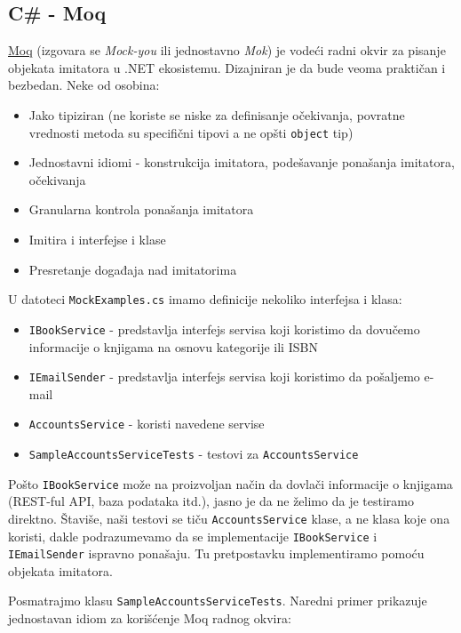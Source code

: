 \subsection{C\# - Moq}\label{c---moq}

\href{https://github.com/moq/}{Moq} (izgovara se \emph{Mock-you} ili jednostavno \emph{Mok}) je vodeći radni okvir za pisanje objekata imitatora u .NET ekosistemu. Dizajniran je da bude veoma praktičan i bezbedan. Neke od osobina:

\begin{itemize}
\tightlist
\item
  Jako tipiziran (ne koriste se niske za definisanje očekivanja, povratne vrednosti metoda su specifični tipovi a ne opšti \texttt{object} tip)
\item
  Jednostavni idiomi - konstrukcija imitatora, podešavanje ponašanja imitatora, očekivanja
\item
  Granularna kontrola ponašanja imitatora
\item
  Imitira i interfejse i klase
\item
  Presretanje događaja nad imitatorima
\end{itemize}

U datoteci \texttt{MockExamples.cs} imamo definicije nekoliko interfejsa i klasa:

\begin{itemize}
\tightlist
\item
  \texttt{IBookService} - predstavlja interfejs servisa koji koristimo da dovučemo informacije o knjigama na osnovu kategorije ili ISBN
\item
  \texttt{IEmailSender} - predstavlja interfejs servisa koji koristimo da pošaljemo e-mail
\item
  \texttt{AccountsService} - koristi navedene servise
\item
  \texttt{SampleAccountsServiceTests} - testovi za \texttt{AccountsService}
\end{itemize}

Pošto \texttt{IBookService} može na proizvoljan način da dovlači informacije o knjigama (REST-ful API, baza podataka itd.), jasno je da ne želimo da je testiramo direktno. Štaviše, naši testovi se tiču \texttt{AccountsService} klase, a ne klasa koje ona koristi, dakle podrazumevamo da se implementacije \texttt{IBookService} i \texttt{IEmailSender} ispravno ponašaju. Tu pretpostavku implementiramo pomoću objekata imitatora.

Posmatrajmo klasu \texttt{SampleAccountsServiceTests}. Naredni primer prikazuje jednostavan idiom za korišćenje Moq radnog okvira:

